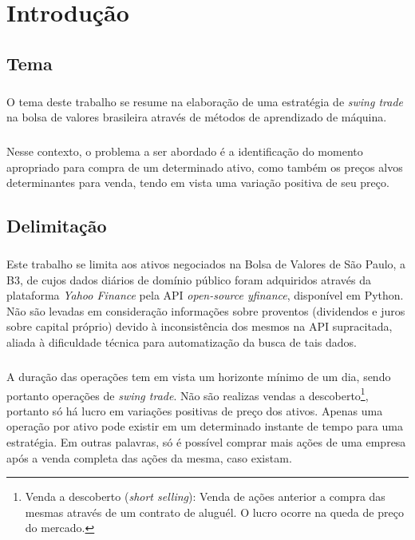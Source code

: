 \chapter{Introdução}
\label{cap1}



\section{Tema}

\paragraph{} O tema deste trabalho se resume na elaboração de uma estratégia de \textit{swing trade} na bolsa de valores brasileira através de métodos de aprendizado de máquina.

\paragraph{} Nesse contexto, o problema a ser abordado é a identificação do momento apropriado para compra de um determinado ativo, como também os preços alvos determinantes para venda, tendo em vista uma variação positiva de seu preço.



\section{Delimitação}

\paragraph{} Este trabalho se limita aos ativos negociados na Bolsa de Valores de São Paulo, a B3, de cujos dados diários de domínio público foram adquiridos através da plataforma \textit{Yahoo Finance} pela API \textit{open-source yfinance}, disponível em Python. Não são levadas em consideração informações sobre proventos (dividendos e juros sobre capital próprio) devido à inconsistência dos mesmos na API supracitada, aliada à dificuldade técnica para automatização da busca de tais dados.

\paragraph{} A duração das operações tem em vista um horizonte mínimo de um dia, sendo portanto operações de \textit{swing trade}. Não são realizas vendas a descoberto\footnote{Venda a descoberto (\textit{short selling}): Venda de ações anterior a compra das mesmas através de um contrato de aluguél. O lucro ocorre na queda de preço do mercado.}, portanto só há lucro em variações positivas de preço dos ativos. Apenas uma operação por ativo pode existir em um determinado instante de tempo para uma estratégia. Em outras palavras, só é possível comprar mais ações de uma empresa após a venda completa das ações da mesma, caso existam.

